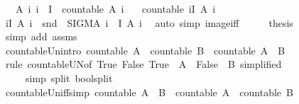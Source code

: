 \begin{isabellebody}
\ \ \ A{\isacharcolon}\ {\isachardoublequoteopen}{\isasymAnd}i{\isachardot}\ i\ {\isasymin}\ I\ {\isasymLongrightarrow}\ countable\ {\isacharparenleft}A\ i{\isacharparenright}{\isachardoublequoteclose}\isanewline
\ \ \ {\isachardoublequoteopen}countable\ {\isacharparenleft}{\isasymUnion}i{\isasymin}I{\isachardot}\ A\ i{\isacharparenright}{\isachardoublequoteclose}\isanewline
%
\isadelimproof
%
\endisadelimproof
%
\isatagproof
{}\isamarkupfalse%
\ {\isacharminus}\isanewline
\ \ \isamarkupfalse%
\ {\isachardoublequoteopen}{\isacharparenleft}{\isasymUnion}i{\isasymin}I{\isachardot}\ A\ i{\isacharparenright}\ {\isacharequal}\ snd\ {\isacharbackquote}\ {\isacharparenleft}SIGMA\ i\ {\isacharcolon}\ I{\isachardot}\ A\ i{\isacharparenright}{\isachardoublequoteclose}\ \isamarkupfalse%
\ {\isacharparenleft}auto\ simp{\isacharcolon}\ image{\isacharunderscore}iff{\isacharparenright}\isanewline
\ \ \isamarkupfalse%
\ \isamarkupfalse%
\ {\isacharquery}thesis\ \isamarkupfalse%
\ {\isacharparenleft}simp\ add{\isacharcolon}\ assms{\isacharparenright}\isanewline
{}\isamarkupfalse%
%
\endisatagproof
{\isafoldproof}%
%
\isadelimproof
\isanewline
%
\endisadelimproof
\isanewline
{}\isamarkupfalse%
\ countable{\isacharunderscore}Un{\isacharbrackleft}intro{\isacharbrackright}{\isacharcolon}\ {\isachardoublequoteopen}countable\ A\ {\isasymLongrightarrow}\ countable\ B\ {\isasymLongrightarrow}\ countable\ {\isacharparenleft}A\ {\isasymunion}\ B{\isacharparenright}{\isachardoublequoteclose}\isanewline
%
\isadelimproof
\ \ %
\endisadelimproof
%
\isatagproof
{}\isamarkupfalse%
\ {\isacharparenleft}rule\ countable{\isacharunderscore}UN{\isacharbrackleft}of\ {\isachardoublequoteopen}{\isacharbraceleft}True{\isacharcomma}\ False{\isacharbraceright}{\isachardoublequoteclose}\ {\isachardoublequoteopen}{\isasymlambda}True\ {\isasymRightarrow}\ A\ {\isacharbar}\ False\ {\isasymRightarrow}\ B{\isachardoublequoteclose}{\isacharcomma}\ simplified{\isacharbrackright}{\isacharparenright}\isanewline
\ \ \ \ \ {\isacharparenleft}simp\ split{\isacharcolon}\ bool{\isachardot}split{\isacharparenright}%
\endisatagproof
{\isafoldproof}%
%
\isadelimproof
\isanewline
%
\endisadelimproof
\isanewline
{}\isamarkupfalse%
\ countable{\isacharunderscore}Un{\isacharunderscore}iff{\isacharbrackleft}simp{\isacharbrackright}{\isacharcolon}\ {\isachardoublequoteopen}countable\ {\isacharparenleft}A\ {\isasymunion}\ B{\isacharparenright}\ {\isasymlongleftrightarrow}\ countable\ A\ {\isasymand}\ countable\ B{\isachardoublequoteclose}\isanewline

\end{isabellebody}
